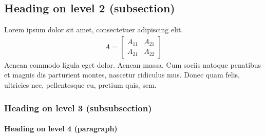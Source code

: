 \documentclass[paper=a4, fontsize=11pt]{scrartcl} %
\numberwithin{equation}{section} %
\numberwithin{figure}{section} %
\numberwithin{table}{section} %
\begin{document}

\subsection{Heading on level 2 (subsection)}

Lorem ipsum dolor sit amet, consectetuer adipiscing elit. 
\begin{align}
A = 
\begin{bmatrix}
A_{11} & A_{21} \\
A_{21} & A_{22}
\end{bmatrix}
\end{align}
Aenean commodo ligula eget dolor. Aenean massa. Cum sociis natoque penatibus et magnis dis parturient montes, nascetur ridiculus mus. Donec quam felis, ultricies nec, pellentesque eu, pretium quis, sem.


\subsubsection{Heading on level 3 (subsubsection)}

\lipsum[3] %

\paragraph{Heading on level 4 (paragraph)}

\lipsum[6] %
\end{document}
